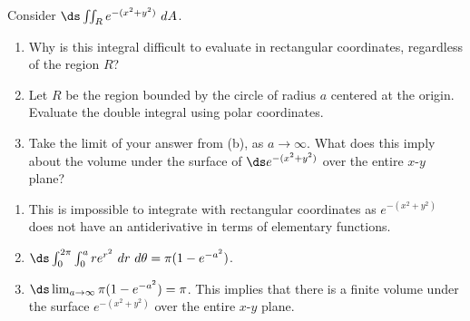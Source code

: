 {Consider $\ds \iint_R e^{-(x^2+y^2)}\ dA$.\label{13_03_ex_15}
	\begin{enumerate}
		\item Why is this integral difficult to evaluate in rectangular coordinates, regardless of the region $R$?
		\item		Let $R$ be the region bounded by the circle of radius $a$ centered at the origin. Evaluate the double integral using polar coordinates.
		\item		Take the limit of your answer from (b), as $a\to\infty$. What does this imply about the volume under the surface of $\ds e^{-(x^2+y^2)}$ over the entire $x$-$y$ plane?
	\end{enumerate}
}
{\begin{enumerate}
	\item This is impossible to integrate with rectangular coordinates as $e^{-(x^2+y^2)}$ does not have an antiderivative in terms of elementary functions.
	\item	$\ds \int_0^{2\pi}\int_0^a re^{r^2}\ dr\ d\theta = \pi(1-e^{-a^2})$.
	\item		$\ds \lim_{a\to\infty} \pi(1-e^{-a^2})=\pi$. This implies that there is a finite volume under the surface $e^{-(x^2+y^2)}$ over the entire $x$-$y$ plane.
\end{enumerate}
}